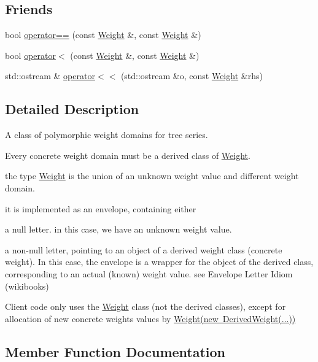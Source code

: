 \subsection*{Friends}
\begin{DoxyCompactItemize}
\item 
bool \mbox{\hyperlink{classWeight_a2908b386adb4cbc893dcf9f631b8a85d}{operator==}} (const \mbox{\hyperlink{classWeight}{Weight}} \&, const \mbox{\hyperlink{classWeight}{Weight}} \&)
\item 
bool \mbox{\hyperlink{classWeight_af75080233bdd2e853a5f3b2b80e262af}{operator$<$}} (const \mbox{\hyperlink{classWeight}{Weight}} \&, const \mbox{\hyperlink{classWeight}{Weight}} \&)
\item 
std\+::ostream \& \mbox{\hyperlink{classWeight_a5fa6fc187426e2cc6aa40f7acddf8455}{operator$<$$<$}} (std\+::ostream \&o, const \mbox{\hyperlink{classWeight}{Weight}} \&rhs)
\end{DoxyCompactItemize}


\subsection{Detailed Description}
A class of polymorphic weight domains for tree series. 

Every concrete weight domain must be a derived class of \mbox{\hyperlink{classWeight}{Weight}}.

the type \mbox{\hyperlink{classWeight}{Weight}} is the union of an unknown weight value and different weight domain.

it is implemented as an envelope, containing either
\begin{DoxyItemize}
\item a null letter. in this case, we have an unknown weight value.
\item a non-\/null letter, pointing to an object of a derived weight class (concrete weight). In this case, the envelope is a wrapper for the object of the derived class, corresponding to an actual (known) weight value. see Envelope Letter Idiom (wikibooks)
\end{DoxyItemize}

Client code only uses the \mbox{\hyperlink{classWeight}{Weight}} class (not the derived classes), except for allocation of new concrete weights values by \mbox{\hyperlink{classWeight}{Weight(new Derived\+Weight(...))}} 

\subsection{Member Function Documentation}
\mbox{\label{classWeight_a6b38fd1721594ffc303858e6201d1b2b}} 

